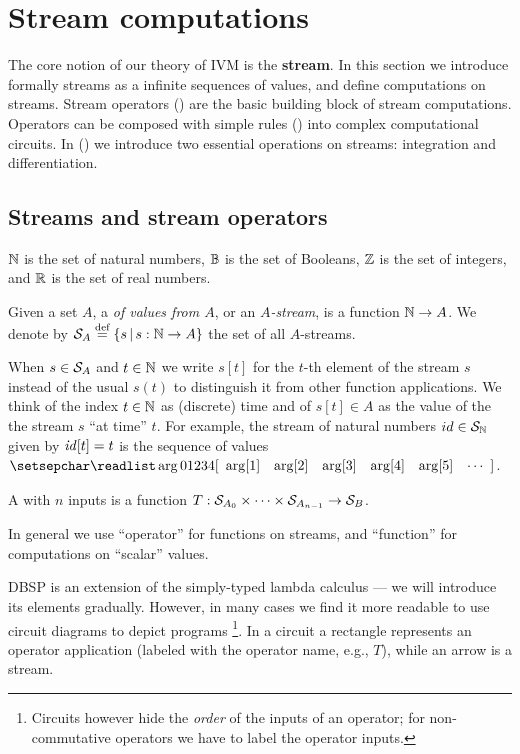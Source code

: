 \section{Stream computations}\label{sec:streams}

The core notion of our theory of IVM is the \textbf{stream}.
In this section we introduce formally streams as a
infinite sequences of values, and define computations on streams.
Stream operators () are the basic building block of stream 
computations.  Operators can be composed with simple rules () 
into complex computational circuits.  
In () we introduce two essential operations on streams: 
integration and differentiation.

\subsection{Streams and stream operators}\label{sec:notation}

$\mathbb{N}$ is the set of natural numbers, $\mathbb{B}$ is the set of Booleans, $\mathbb{Z}$ is the set of integers, and $\mathbb{R}$ is the set of real numbers.

\begin{definition}[stream]
Given a set $A$, a  \emph{of values from $A$}, or an \emph{$A$-stream}, is a function $\mathbb{N} \rightarrow A$. 
We denote by $\mathcal{S}_{A} \stackrel{\textrm{\scriptsize def}}{=} \{ s \,|\, s : \mathbb{N} \to A \}$ the set of all $A$-streams. 
\end{definition}

When $s\in\mathcal{S}_{A}$ and $t\in\mathbb{N}$ we 
write $s[t]$ for the $t$-th element of the stream $s$ instead of the usual $s(t)$
to distinguish it from other function applications.
We think of the index $t\in\mathbb{N}$ as (discrete) time and of $s[t]\in A$ 
as the value of the the stream $s$ ``at time'' $t$.
\ifstreamexamples
For example, the stream of natural numbers $id \in \mathcal{S}_{\mathbb{N}}$ given by $\mathit{id}[t] = t$ is the sequence of values
$\sv{0 1 2 3 4}$.
\fi

\begin{definition}
A  with $n$ inputs is a function $T:\mathcal{S}_{A_0}\times\cdots\times\mathcal{S}_{A_{n-1}}\to\mathcal{S}_{B}$. 
\end{definition}

In general we use ``operator'' for functions on streams, and
``function'' for computations on ``scalar'' values.

DBSP is an extension of the simply-typed lambda calculus ---
we will introduce its elements gradually.  However, in many cases we find it more readable to
use circuit diagrams to depict \dbsp programs
\footnote{Circuits however hide the \emph{order} of the inputs of an operator; for non-commutative
operators we have to label the operator inputs.}.
In a circuit a rectangle represents an operator application (labeled
with the operator name, e.g., $T$), while an arrow is a stream.  


